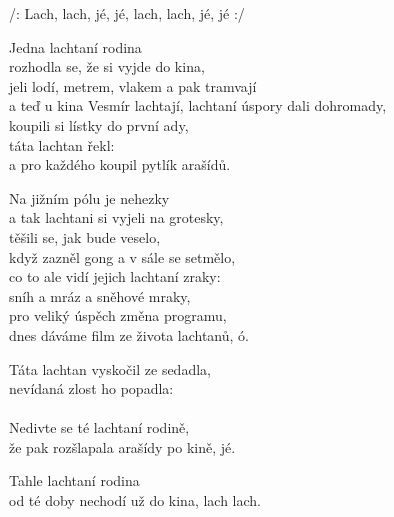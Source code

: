 
\cho{}
/: Lach, lach, jé, jé,  lach, lach, jé, jé :/

\ve{}
Jedna lachtaní rodina\\
rozhodla se, že si vyjde do kina,\\
jeli lodí, metrem, vlakem a pak tramvají\\
a teď u kina Vesmír lachtají,
lachtaní úspory dali dohromady,\\
koupili si lístky do první ady,\\
táta lachtan řekl: \\
a pro každého koupil pytlík arašídů.

\cho{}

\ve{}
Na jižním pólu je nehezky\\
a tak lachtani si vyjeli na grotesky,\\
těšili se, jak bude veselo,\\
když zazněl gong a v sále se setmělo,\\
co to ale vidí jejich lachtaní zraky:\\
sníh a mráz a sněhové mraky,\\
pro veliký úspěch změna programu,\\
dnes dáváme film ze života lachtanů, ó.

\cho{}

\ve{}
Táta lachtan vyskočil ze sedadla,\\
nevídaná zlost ho popadla:\\
\\
Nedivte se té lachtaní rodině,\\
že pak rozšlapala arašídy po kině, jé.

\cho{}

\ve{}
Tahle lachtaní rodina\\
od té doby nechodí už do kina, lach lach. 

\esong